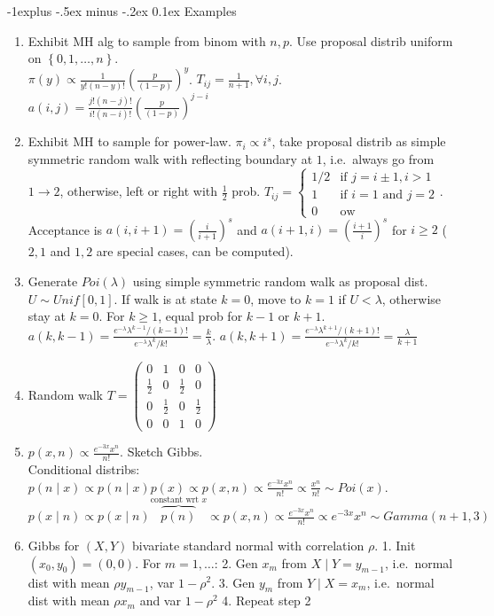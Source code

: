 \documentclass[landscape]{article}
\makeatletter
\renewcommand{\subsection}{\@startsection{subsection}{2}{0mm}%
                                {-1explus -.5ex minus -.2ex}%
                                {0.1ex}%
                                {\color{orange}\normalfont\normalsize\bfseries}}
\makeatother
\begin{document}
\begin{multicols*}{3}
\subsection{Examples}
\begin{enumerate}
\item
Exhibit MH alg to sample from binom with $n, p$. Use proposal distrib
uniform on $\left\{0,1,\ldots,n\right\}$.
\\ $\pi(y) \propto \frac{1}{y!(n-y)!}
\left(\frac{p}{(1-p)}\right)^y$. $T_{ij} = \frac{1}{n+1}, \forall i,
j$. $a(i,j) = \frac{j!(n-j)!}{i!(n-i)!}
\left(\frac{p}{(1-p)}\right)^{j-i}$
\item Exhibit MH to sample for power-law. $\pi_i \propto i^s$, take
proposal distrib as simple symmetric random walk with reflecting
boundary at $1$, i.e.\ always go from $1 \to 2$, otherwise, left or
right with $\frac{1}{2}$ prob. $T_{ij} =
\begin{cases}
  1/2 & \text{if } j = i \pm 1, i > 1
  \\ 1 & \text{if } i = 1 \text{ and } j = 2
  \\ 0 & \text{ow}
\end{cases}
$.\\ Acceptance is $a(i, i+1) = \left(\frac{i}{i+1}\right)^s$ and $a(i +
1, i) = \left(\frac{i+1}{i}\right)^s$ for $i \geq 2$ ($2,1$ and $1,2$
are special cases, can be computed).
\item Generate $Poi(\lambda)$ using simple symmetric random walk as
proposal dist.
\\ $U \sim Unif[0,1]$. If walk is at state $k = 0$, move to $k=1$ if
$U < \lambda$, otherwise stay at $k = 0$. For $k \geq 1$, equal prob
for $k - 1$ or $k + 1$. $a(k, k - 1) =
\frac{e^{-\lambda}\lambda^{k-1}/(k-1)!}{e^{-\lambda}\lambda^k/k!} =
\frac{k}{\lambda}$. $a(k, k + 1) =
\frac{e^{-\lambda}\lambda^{k+1}/(k+1)!}{e^{-\lambda}\lambda^k/k!} =
\frac{\lambda}{k+1}$
\item Random walk $T =
  \begin{pmatrix}
    0 & 1 & 0 & 0
    \\ \frac{1}{2} & 0 & \frac{1}{2} & 0
    \\ 0 & \frac{1}{2} & 0 & \frac{1}{2}
    \\ 0 &0 & 1&0
  \end{pmatrix}
$
\item $p(x,n) \propto \frac{e^{-3x}x^n}{n!}$. Sketch Gibbs.
\\ Conditional distribs: $p(n \mid x) \propto p(n \mid x) p(x) \propto
p(x,n) \propto \frac{e^{-3x}x^n}{n!} \propto \frac{x^n}{n!} \sim
Poi(x)$. $p(x \mid n) \propto p(x \mid n)
\overbrace{p(n)}^{\text{constant wrt }x} \propto p(x,n) \propto
\frac{e^{-3x}x^n}{n!} \propto e^{-3x}x^n \sim Gamma(n+1, 3)$
\item Gibbs for $(X,Y)$ bivariate standard normal with correlation
  $\rho$. 1. Init $(x_0, y_0) = (0,0)$. For $m = 1, \ldots$: 2. Gen
  $x_m$ from $X \mid Y = y_{m-1}$, i.e.\ normal dist with mean $\rho
  y_{m-1}$, var $1-\rho^2$. 3. Gen $y_m$ from $Y \mid X = x_m$, i.e.\
  normal dist with mean $\rho x_m$ and var $1 - \rho^2$ 4. Repeat step 2
\end{enumerate}

\end{multicols*}
\end{document}
